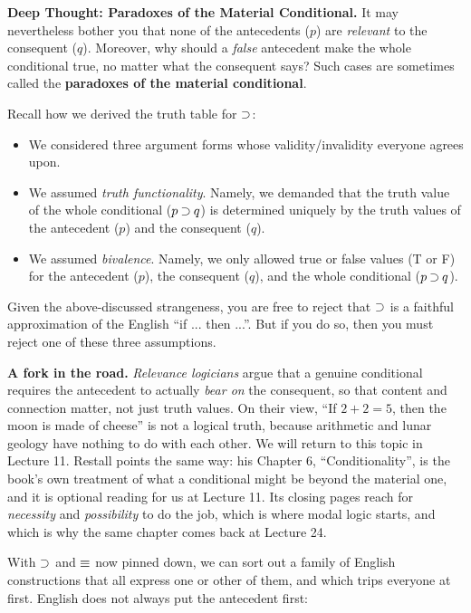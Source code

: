 \documentclass[options]{philosophersimprint}
\theoremstyle{definition}
\begin{document}
\begin{framed}
\noindent\textbf{Deep Thought: Paradoxes of the Material Conditional.}
It may nevertheless bother you that none of the antecedents ($p$) are \textit{relevant} to the consequent ($q$). Moreover, why should a \textit{false} antecedent make the whole conditional true, no matter what the consequent says? Such cases are sometimes called the \textbf{paradoxes of the material conditional}.

Recall how we derived the truth table for $\mathbin{\supset}$:
\begin{itemize}
    \item We considered three argument forms whose validity/invalidity everyone agrees upon.
    \item We assumed \textit{truth functionality}. Namely, we demanded that the truth value of the whole conditional ($p\mathbin{\supset} q$) is determined uniquely by the truth values of the antecedent ($p$) and the consequent ($q$).
    \item We assumed \textit{bivalence}. Namely, we only allowed true or false values (T or F) for the antecedent ($p$), the consequent ($q$), and the whole conditional ($p\mathbin{\supset} q$).
\end{itemize}
Given the above-discussed strangeness, you are free to reject that $\mathbin{\supset}$ is a faithful approximation of the English ``if ... then ...''. But if you do so, then you must reject one of these three assumptions.

\textbf{A fork in the road.} \textit{Relevance logicians} argue that a genuine conditional requires the antecedent to actually \textit{bear on} the consequent, so that content and connection matter, not just truth values. On their view, ``If $2+2=5$, then the moon is made of cheese'' is not a logical truth, because arithmetic and lunar geology have nothing to do with each other. We will return to this topic in Lecture 11. Restall points the same way: his Chapter 6, ``Conditionality'', is the book's own treatment of what a conditional might be beyond the material one, and it is optional reading for us at Lecture 11. Its closing pages reach for \textit{necessity} and \textit{possibility} to do the job, which is where modal logic starts, and which is why the same chapter comes back at Lecture 24.
\end{framed}
With $\mathbin{\supset}$ and $\mathbin{\equiv}$ now pinned down, we can sort out a family of English constructions that all express one or other of them, and which trips everyone at first. English does not always put the antecedent first:
\vspace{-0.3cm}
\end{document}
